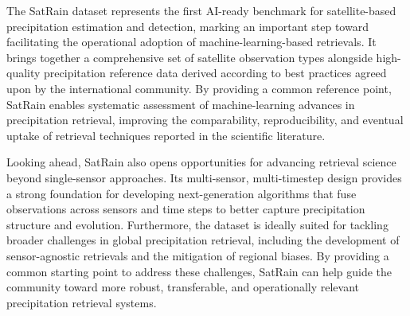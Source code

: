 \documentclass[11pt]{article}
\begin{document}
The SatRain dataset represents the first AI-ready benchmark for satellite-based
precipitation estimation and detection, marking an important step toward
facilitating the operational adoption of machine-learning-based retrievals. It
brings together a comprehensive set of satellite observation types alongside
high-quality precipitation reference data derived according to best practices
agreed upon by the international community. By providing a common reference
point, SatRain enables systematic assessment of machine-learning advances in
precipitation retrieval, improving the comparability, reproducibility, and
eventual uptake of retrieval techniques reported in the scientific literature.

Looking ahead, SatRain also opens opportunities for advancing retrieval science
beyond single-sensor approaches. Its multi-sensor, multi-timestep design
provides a strong foundation for developing next-generation algorithms that fuse
observations across sensors and time steps to better capture precipitation
structure and evolution. Furthermore, the dataset is ideally suited for tackling
broader challenges in global precipitation retrieval, including the development
of sensor-agnostic retrievals and the mitigation of regional biases. By
providing a common starting point to address these challenges, SatRain can help
guide the community toward more robust, transferable, and operationally relevant
precipitation retrieval systems.




\end{document}
